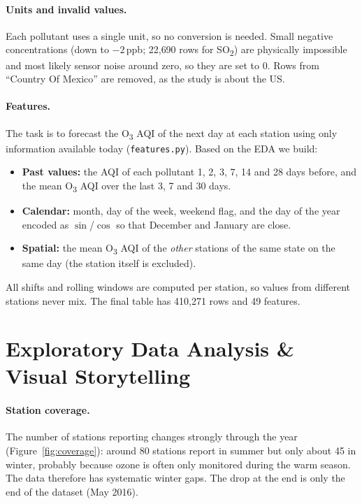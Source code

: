 \documentclass[11pt,a4paper]{article}
\begin{document}
\paragraph{Units and invalid values.} Each pollutant uses a single unit, so no
conversion is needed. Small negative concentrations (down to $-2$\,ppb; 22{,}690 rows
for SO\textsubscript{2}) are physically impossible and most likely sensor noise
around zero, so they are set to 0. Rows from ``Country Of Mexico'' are removed, as
the study is about the US.

\paragraph{Features.} The task is to forecast the O\textsubscript{3} AQI of the next
day at each station using only information available today
(\texttt{features.py}). Based on the EDA we build:
\begin{itemize}
  \item \textbf{Past values:} the AQI of each pollutant 1, 2, 3, 7, 14 and 28 days
        before, and the mean O\textsubscript{3} AQI over the last 3, 7 and 30 days.
  \item \textbf{Calendar:} month, day of the week, weekend flag, and the day of the
        year encoded as $\sin$/$\cos$ so that December and January are close.
  \item \textbf{Spatial:} the mean O\textsubscript{3} AQI of the \emph{other}
        stations of the same state on the same day (the station itself is excluded).
\end{itemize}
All shifts and rolling windows are computed per station, so values from different
stations never mix. The final table has 410{,}271 rows and 49 features.

\section{Exploratory Data Analysis \& Visual Storytelling}

\paragraph{Station coverage.} The number of stations reporting changes strongly
through the year (Figure~\ref{fig:coverage}): around 80 stations report in summer
but only about 45 in winter, probably because ozone is often only monitored during
the warm season. The data therefore has systematic winter gaps. The drop at the end
is only the end of the dataset (May 2016).
\end{document}
